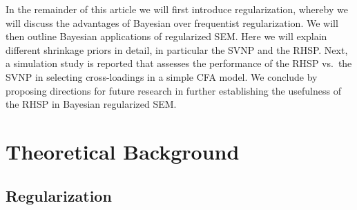 \documentclass[
  man, donotrepeattitle,floatsintext]{apa6}
\begin{document}
In the remainder of this article we will first introduce regularization, whereby we will discuss the advantages of Bayesian over frequentist regularization. We will then outline Bayesian applications of regularized SEM. Here we will explain different shrinkage priors in detail, in particular the SVNP and the RHSP. Next, a simulation study is reported that assesses the performance of the RHSP vs.~the SVNP in selecting cross-loadings in a simple CFA model. We conclude by proposing directions for future research in further establishing the usefulness of the RHSP in Bayesian regularized SEM.

\hypertarget{theoretical-background}{%
\section{Theoretical Background}\label{theoretical-background}}

\hypertarget{regularization}{%
\subsection{Regularization}\label{regularization}}
\end{document}
